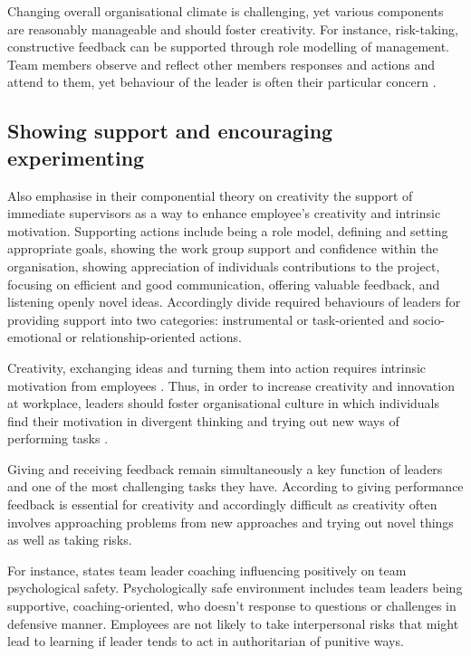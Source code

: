 Changing overall organisational climate is challenging, yet various components are reasonably manageable and should foster creativity. For instance, risk-taking, constructive feedback can be supported through role modelling of management. \citep{shalley2004leaders} Team members observe and reflect other members responses and actions and attend to them, yet behaviour of the leader is often their particular concern \citep{tyler1992relational}.

\subsection{Showing support and encouraging experimenting}

Also \citep{amabile2004leader} emphasise in their componential theory on creativity the support of immediate supervisors as a way to enhance employee's creativity and intrinsic motivation. Supporting actions include being a role model, defining and setting appropriate goals, showing the work group support and confidence within the organisation, showing appreciation of individuals contributions to the project, focusing on efficient and good communication, offering valuable feedback, and listening openly novel ideas. Accordingly \citep{amabile2004leader} divide required behaviours of leaders for providing support into two categories: instrumental or task-oriented and socio-emotional or relationship-oriented actions.

Creativity, exchanging ideas and turning them into action requires intrinsic motivation from employees \citep{jung2001transformational}. Thus, in order to increase creativity and innovation at workplace, leaders should foster organisational culture in which individuals find their motivation in divergent thinking and trying out new ways of performing tasks \citep{amabile1998kill}. 

Giving and receiving feedback remain simultaneously a key function of leaders and one of the most challenging tasks they have. According to \citet{shalley2004leaders} giving performance feedback is essential for creativity and accordingly difficult as creativity often involves approaching problems from new approaches and trying out novel things as well as taking risks. 

For instance, \citet{edmondson1999psychological} states team leader coaching influencing positively on team psychological safety. Psychologically safe environment includes team leaders being supportive, coaching-oriented, who doesn't response to questions or challenges in defensive manner. Employees are not likely to take interpersonal risks that might lead to learning if leader tends to act in authoritarian of punitive ways. 

